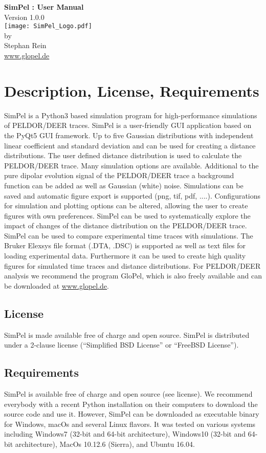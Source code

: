 \documentclass[pdftex,bezier,german,a4,twoside, headexclude,12pt,nochapterprefix, titlepage]{extarticle}
\newcommand{\simpel}{\textsf{SimPel} }
\begin{document}
\thispagestyle{empty}
\begin{center}
\textbf{\Large \simpel: User Manual}\\[1.5cm]
{\large Version 1.0.0} \\[1.5cm]
\texttt{[image: SimPel\_Logo.pdf]}\\[2cm]
by \\[0.5cm]
{\Large Stephan Rein}\\[1cm]
{\large \url{www.glopel.de}}
\end{center}
\newpage


\section{Description, License, Requirements}
\simpel is a Python3 based simulation program for high-performance simulations of PELDOR/DEER traces. \simpel is a user-friendly GUI application based on the PyQt5 GUI framework.
Up to five Gaussian distributions with independent
linear coefficient and standard deviation and can be used for creating a distance distributions. The user defined distance distribution
is used to calculate the PELDOR/DEER trace. Many simulation options are available. Additional to the pure dipolar evolution signal of the PELDOR/DEER trace a background function
can be added as well as Gaussian (white) noise. Simulations can be saved and automatic figure export is supported (png, tif, pdf, ....).
Configurations for simulation and plotting options can be altered, allowing the user to create figures with own preferences.
\simpel can be used to systematically explore the impact of changes of the distance distribution on the PELDOR/DEER trace.
\simpel can be used to compare experimental time traces with simulations. The Bruker Elexsys file format (.DTA, .DSC)
is supported as well as text files for loading experimental data. Furthermore it can be used to create high quality figures for 
simulated time traces and distance distributions.
For PELDOR/DEER analysis we recommend the program GloPel, which is also freely available and can be downloaded at {\url{www.glopel.de}}.

\subsection{License}
\simpel is made available free of charge and open source. 
\simpel is distributed under a 2-clause license (“Simplified BSD License” or “FreeBSD License”).

\subsection{Requirements}
\simpel is available free of charge and open source (see license). We recommend everybody with a recent Python installation on their computers to download the source code and use it. 
However, 
\simpel can be downloaded as executable binary for Windows, macOs and several Linux flavors.
It was tested on various systems including Windows7 (32-bit and 64-bit architecture), Windows10 (32-bit and 64-bit architecture), MacOs 10.12.6 (Sierra),
and Ubuntu 16.04.\\
\end{document}
